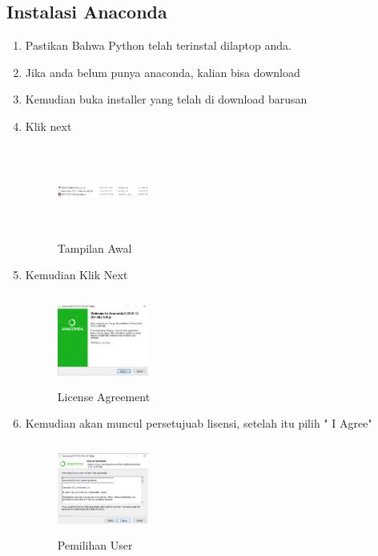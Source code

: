 \subsection{Instalasi Anaconda}
\begin{enumerate}
    \item Pastikan Bahwa Python telah terinstal dilaptop anda.
    \item Jika anda belum punya anaconda, kalian bisa download
    \item Kemudian buka installer yang telah di download barusan
    \item Klik next
    \begin{figure}[!htbp]
        \centering
        \includegraphics[width=3cm,height=3cm]{figures/g1.png}
        \caption{Tampilan Awal}
        \label{awal}
        \end{figure}

    \item Kemudian Klik Next
    \begin{figure}[!htbp]
        \centering
        \includegraphics[width=3cm,height=3cm]{figures/g2.png}
        \caption{License Agreement}
        \label{License}
        \end{figure}

    \item Kemudian akan muncul persetujuab lisensi, setelah itu pilih " I Agree"
    \begin{figure}[!htbp]
        \centering
        \includegraphics[width=3cm,height=3cm]{figures/g3.png}
        \caption{Pemilihan User}
        \label{User}
        \end{figure}


\end{enumerate}
